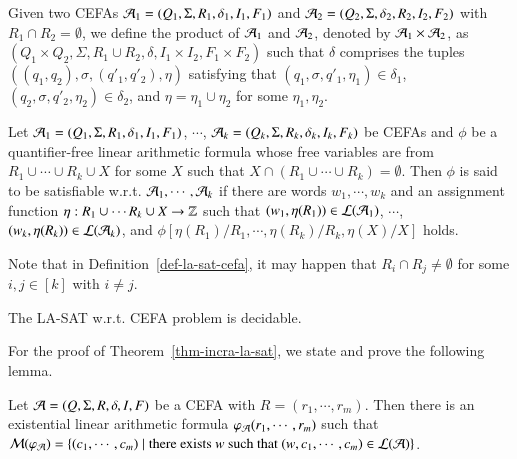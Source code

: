 \documentclass{llncs}
\begin{document}
Given two CEFAs $\mathcal{A}_1 = ( Q_1, \Sigma, R_1, \delta_1, I_1, F_1)$ and $\mathcal{A}_2 = (Q_2, \Sigma, \delta_2, R_2, I_2, F_2)$ with $R_1 \cap R_2 = \emptyset$, we define the product of $\mathcal{A}_1$ and $\mathcal{A}_2$, denoted by $\mathcal{A}_1 \times \mathcal{A}_2$, as $(Q_1 \times Q_2, \Sigma, R_1 \cup R_2, \delta, I_1 \times I_2, F_1 \times F_2)$ such that $\delta$ comprises the tuples $((q_1, q_2), \sigma, (q'_1, q'_2), \eta)$ satisfying that $(q_1, \sigma, q'_1, \eta_1) \in \delta_1$, $(q_2, \sigma, q'_2, \eta_2) \in \delta_2$, and $\eta = \eta_1\cup \eta_2$ for some $\eta_1, \eta_2$.


\begin{definition}\label{def-la-sat-cefa}
Let $\mathcal{A}_1=(Q_1, \Sigma, R_1, \delta_1, I_1, F_1)$, $\cdots$, $\mathcal{A}_k=(Q_k, \Sigma, R_k, \delta_k, I_k, F_k)$ be CEFAs
  and $\phi$ be a quantifier-free linear arithmetic formula whose free variables are from  $R_1 \cup \cdots \cup R_k \cup X$ for some $X$ such that $X \cap (R_1 \cup \cdots \cup R_k) = \emptyset$. Then $\phi$ is said to be satisfiable w.r.t. $\mathcal{A}_1, \cdots, \mathcal{A}_k$ if  there are words $w_1, \cdots, w_k$ and an assignment function $\eta: R_1 \cup \cdots R_k \cup X \rightarrow \mathbb{Z}$  %
 such that  $(w_1, \eta(R_1)) \in \mathcal{L}(\mathcal{A}_1)$, $ \cdots$, $(w_k, \eta(R_k)) \in \mathcal{L}(\mathcal{A}_k)$, and $\phi[\eta(R_1)/R_1, \cdots,\eta(R_k)/R_k, \eta(X)/X]$ holds.
\end{definition}
Note that in Definition~\ref{def-la-sat-cefa}, it may happen that $R_i \cap R_j \neq \emptyset$ for some $i, j \in [k]$ with $i \neq j$.

\begin{theorem}\label{thm-incra-la-sat}
The LA-SAT w.r.t. CEFA problem is decidable.
\end{theorem}

For the proof of Theorem~\ref{thm-incra-la-sat}, we state and prove the following lemma. 

\begin{lemma}\label{lem-incra-la}
Let $\mathcal{A}=(Q, \Sigma, R, \delta, I, F)$ be a CEFA with $R= (r_1, \cdots,  r_m)$. Then there is an existential linear arithmetic formula $\varphi_{\mathcal{A}}(r_1, \cdots, r_m)$ such that $\mathcal{M}(\varphi_{\mathcal{A}})= \{(c_1, \cdots, c_m) \mid \mbox{there exists } w \mbox{ such that } (w, c_1, \cdots, c_m) \in \mathcal{L}(\mathcal{A})\}$.
\end{lemma}
\end{document}
